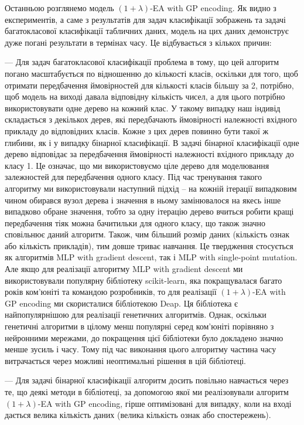 Останньою розглянемо модель $(1+\lambda)$-EA with GP encoding. Як видно з експериментів, а саме з результатів для задач класифікації зображень та задачі багатокласової класифікації табличних даних, модель на цих даних демонструє дуже погані результати в термінах часу. Це відбувається з кількох причин: 

--- Для задач багатокласової класифікації проблема в тому, що цей алгоритм погано масштабується по відношенню до кількості класів, оскільки для того, щоб отримати передбачення ймовірностей для кількості класів більшу за 2, потрібно, щоб модель на виході давала відповідну кількість чисел, а для цього потрібно використовувати одне дерево на кожний клас. У такому випадку наш індивід складається з декількох дерев, які передбачають ймовірності належності вхідного прикладу до відповідних класів. Кожне з цих дерев повинно бути такої ж глибини, як і у випадку бінарної класифікації. В задачі бінарної класифікації одне дерево відповідає за передбачення ймовірності належності вхідного прикладу до класу 1. Це означає, що ми використовуємо ціле дерево для моделювання залежностей для передбачення одного класу. Під час тренування такого алгоритму ми використовували наступний підхід -- на кожній ітерації випадковим чином обирався вузол дерева і значення в ньому замінювалося на якесь інше випадково обране значення, тобто за одну ітерацію дерево вчиться робити кращі передбачення тіяк можна бачитильки для одного класу, що також значно сповільнює даний алгоритм. Також, чим більший розмір даних (кількість ознак або кількість прикладів), тим довше триває навчання. Це твердження стосується як алгоритмів MLP with gradient descent, так і MLP with single-point mutation. Але якщо для реалізації алгоритму MLP with gradient descent ми використовували популярну бібліотеку scikit-learn, яка покращувалася багато років ком'юніті та командою розробників, то для реалізації $(1+\lambda)$-EA with GP encoding ми скористалися бібліотекою Deap. Ця бібліотека є найпопулярнішою для реалізації генетичних алгоритмів. Однак, оскільки генетичні алгоритми в цілому менш популярні серед ком'юніті порівняно з нейронними мережами, до покращення цієї бібліотеки було докладено значно менше зусиль і часу. Тому під час виконання цього алгоритму частина часу витрачається через можливі неоптимальні рішення в цій бібліотеці.

--- Для задачі бінарної класифікації алгоритм досить повільно навчається через те, що деякі методи в бібліотеці, за допомогою якої ми реалізовували алгоритм $(1+\lambda)$-EA with GP encoding, гірше оптимізовані для випадку, коли на вході дається велика кількість даних (велика кількість ознак або спостережень).

